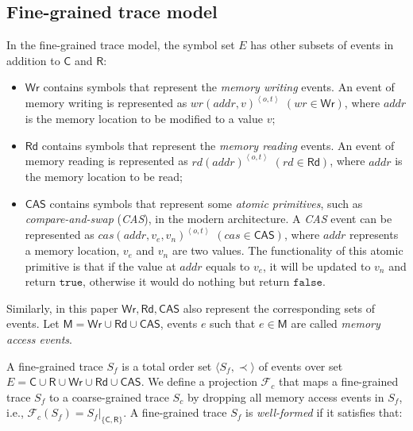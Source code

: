 \documentclass[runningheads]{llncs}
\newcommand{\ecall}{\mathsf{C}}
\newcommand{\eresp}{\mathsf{R}}
\newcommand{\ewrite}{\mathsf{Wr}}
\newcommand{\eread}{\mathsf{Rd}}
\newcommand{\ecas}{\mathsf{CAS}}
\newcommand{\pair}[1]{{\langle{#1}\rangle}}
\begin{document}
\subsection{Fine-grained trace model}\label{sec:finegraintm}


In the fine-grained trace model,  the symbol set $E$ has other subsets of events in addition to $\ecall$ and $\eresp$:

\begin{itemize}
  \item $\ewrite$ contains symbols that represent the \textit{memory writing} events. An event of memory writing is represented as $wr(addr,v)^{\left\langle o,t\right\rangle}$ $(wr \in \ewrite)$, where $addr$ is the memory location to be modified to a value $v$;
  \item $\eread$ contains symbols that represent the \textit{memory reading} events. An event of memory reading is represented as $rd(addr)^{\left\langle o,t\right\rangle}$ $(rd \in \eread)$, where $addr$ is the memory location to be read;
  \item $\ecas$ contains symbols that represent some \textit{atomic primitives}, such as \textit{compare-and-swap} (\textit{CAS}), in the modern architecture. A \textit{CAS} event can be represented as $cas(addr, v_e, v_n)^{\left\langle o,t\right\rangle}$ $(cas \in \ecas)$, where $addr$ represents a memory location, $v_e$ and $v_n$ are two values. The functionality of this atomic primitive is that if the value at $addr$ equals to $v_e$, it will be updated to $v_n$ and return $\mathtt{true}$, otherwise it would do nothing but return $\mathtt{false}$.
\end{itemize}
\noindent Similarly, in this paper $\ewrite, \eread, \ecas$ also represent the corresponding sets of events. Let $\mathsf{M} = \ewrite\cup\eread\cup\ecas$, events $e$ such that $e\in \mathsf{M}$ are called \textit{memory access events}.


A fine-grained trace $S_f$ is a total order set $\pair{S_f,\prec}$ of events over set $E= \ecall\cup \eresp\cup \ewrite\cup \eread\cup \ecas $.
We define a projection $\mathcal{F}_{c}$ that maps a fine-grained trace $S_f$ to a coarse-grained trace $S_c$ by dropping all memory access events in $S_f$, i.e., $ \mathcal{F}_c(S_f) = S_f|_{\{\ecall,\eresp\} }$. A fine-grained trace $S_f$ is \textit{well-formed} if it satisfies that:
\end{document}
